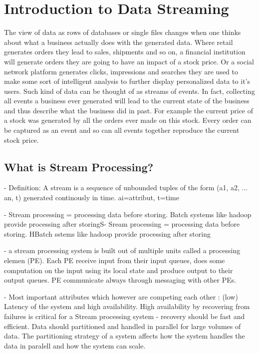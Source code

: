 \chapter{Introduction to Data Streaming}

The view of data as rows of databases or single files changes when one thinks
about what a business actually does with the generated data. Where retail
generates orders they lead to sales, shipments and so on, a financial institution will
generate orders they are going to have an impact of a stock price. Or a social
network platform generates clicks, impressions and searches they are used to
make some sort of intelligent analysis to further display personalized data to
it's users. Such kind of data can be thought of as streams of events. In fact,
collecting all events a business ever generated will lead to the current state
of the business and thus describe what the business did in past. For example the
current price of a stock was generated by all the orders ever made on this
stock. Every order can be captured as an event and so can all events together reproduce
the current stock price.


\section{What is Stream Processing?}
- Definition: A stream is a sequence of unbounded tuples of the form (a1, a2,
... an, t) generated continously in time. ai=attribut, t=time

- Stream processing = processing data before storing. Batch systems like hadoop
provide processing after storingS- Sream processing = processing data before
storing. HBatch sstems like hadoop provide processing after storing  

- a stream processing system is built out of multiple units called a processing
elemen (PE). Each PE receive input from their input queues, does some
computation on the input using its local state and produce output to their
output queues. PE communicate always through messaging with other PEs.

- Most important attributes which however are competing each other : (low)
Latency of the system and high availability. High availability by recovering
from failures is critical for a Stream processing system - recovery should be
fast and efficient. Data should partitioned and handled in parallel for large
volumes of data. The partitioning strategy of a system  affects how the system
handles the data in paralell and how the system can scale. 

